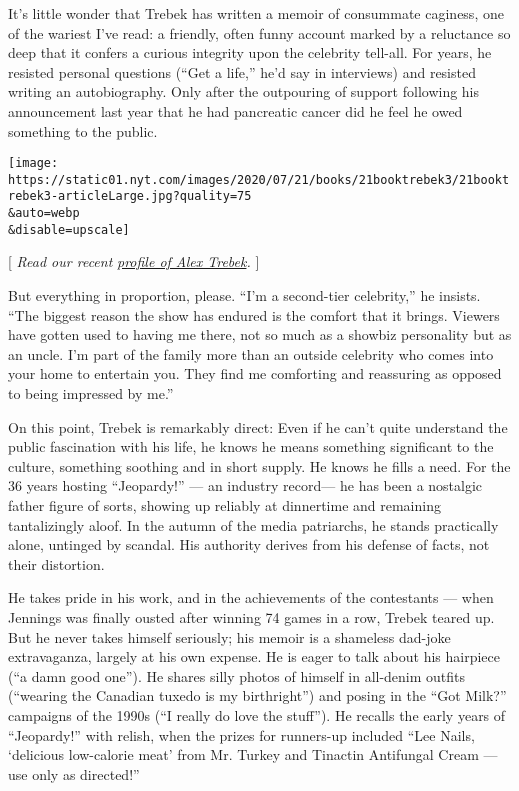 It's little wonder that Trebek has written a memoir of consummate
caginess, one of the wariest I've read: a friendly, often funny account
marked by a reluctance so deep that it confers a curious integrity upon
the celebrity tell-all. For years, he resisted personal questions (``Get
a life,'' he'd say in interviews) and resisted writing an autobiography.
Only after the outpouring of support following his announcement last
year that he had pancreatic cancer did he feel he owed something to the
public.

\texttt{[image: https://static01.nyt.com/images/2020/07/21/books/21booktrebek3/21booktrebek3-articleLarge.jpg?quality=75\\\&auto=webp\\\&disable=upscale]}

{[} \emph{Read our recent}
\href{https://www.nytimes.com/2020/07/17/books/alex-trebek-jeopardy-the-answer-is.html}{\emph{profile
of Alex Trebek}}\emph{.} {]}

But everything in proportion, please. ``I'm a second-tier celebrity,''
he insists. ``The biggest reason the show has endured is the comfort
that it brings. Viewers have gotten used to having me there, not so much
as a showbiz personality but as an uncle. I'm part of the family more
than an outside celebrity who comes into your home to entertain you.
They find me comforting and reassuring as opposed to being impressed by
me.''

On this point, Trebek is remarkably direct: Even if he can't quite
understand the public fascination with his life, he knows he means
something significant to the culture, something soothing and in short
supply. He knows he fills a need. For the 36 years hosting ``Jeopardy!''
--- an industry record--- he has been a nostalgic father figure of
sorts, showing up reliably at dinnertime and remaining tantalizingly
aloof. In the autumn of the media patriarchs, he stands practically
alone, untinged by scandal. His authority derives from his defense of
facts, not their distortion.

He takes pride in his work, and in the achievements of the contestants
--- when Jennings was finally ousted after winning 74 games in a row,
Trebek teared up. But he never takes himself seriously; his memoir is a
shameless dad-joke extravaganza, largely at his own expense. He is eager
to talk about his hairpiece (``a damn good one''). He shares silly
photos of himself in all-denim outfits (``wearing the Canadian tuxedo is
my birthright'') and posing in the ``Got Milk?'' campaigns of the 1990s
(``I really do love the stuff''). He recalls the early years of
``Jeopardy!'' with relish, when the prizes for runners-up included ``Lee
Nails, `delicious low-calorie meat' from Mr. Turkey and Tinactin
Antifungal Cream --- use only as directed!''

